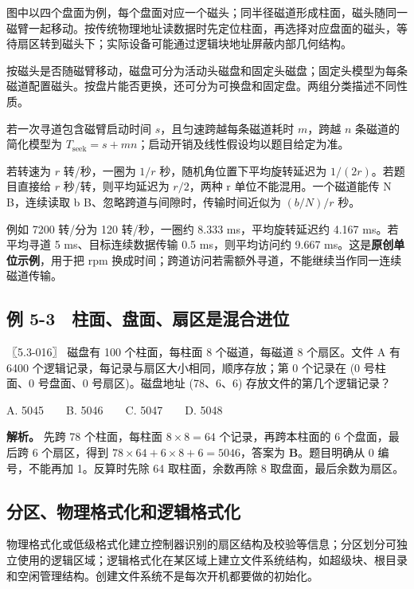 图中以四个盘面为例，每个盘面对应一个磁头；同半径磁道形成柱面，磁头随同一磁臂一起移动。按传统物理地址读数据时先定位柱面，再选择对应盘面的磁头，等待扇区转到磁头下；实际设备可能通过逻辑块地址屏蔽内部几何结构。

按磁头是否随磁臂移动，磁盘可分为活动头磁盘和固定头磁盘；固定头模型为每条磁道配置磁头。按盘片能否更换，还可分为可换盘和固定盘。两组分类描述不同性质。

若一次寻道包含磁臂启动时间 \(s\)，且匀速跨越每条磁道耗时 \(m\)，跨越 \(n\) 条磁道的简化模型为 \(T_{\mathrm{seek}}=s+mn\)；启动开销及线性假设均以题目给定为准。

若转速为 \(r\) 转/秒，一圈为 \(1/r\) 秒，随机角位置下平均旋转延迟为 \(1/(2r)\)。若题目直接给 \(r\) 秒/转，则平均延迟为 \(r/2\)，两种 r 单位不能混用。一个磁道能传 N B，连续读取 b B、忽略跨道与间隙时，传输时间近似为 \((b/N)/r\) 秒。

例如 7200 转/分为 120 转/秒，一圈约 8.333 ms，平均旋转延迟约 4.167 ms。若平均寻道 5 ms、目标连续数据传输 0.5 ms，则平均访问约 9.667 ms。这是\textbf{原创单位示例}，用于把 rpm 换成时间；跨道访问若需额外寻道，不能继续当作同一连续磁道传输。

\subsection{例 5-3　柱面、盘面、扇区是混合进位}\label{OS05-ex7-3}

\begin{example}[配套例题]

〖5.3-016〗 磁盘有 100 个柱面，每柱面 8 个磁道，每磁道 8 个扇区。文件 A 有 6400 个逻辑记录，每记录与扇区大小相同，顺序存放；第 0 个记录在 (0 号柱面、0 号盘面、0 号扇区)。磁盘地址 (78、6、6) 存放文件的第几个逻辑记录？

A. 5045　　B. 5046　　C. 5047　　D. 5048

\end{example}

\textbf{解析。} 先跨 78 个柱面，每柱面 \(8\times8=64\) 个记录，再跨本柱面的 6 个盘面，最后跨 6 个扇区，得到 \(78\times64+6\times8+6=5046\)，答案为 \textbf{B}。题目明确从 0 编号，不能再加 1。反算时先除 64 取柱面，余数再除 8 取盘面，最后余数为扇区。

\subsection{分区、物理格式化和逻辑格式化}\label{OS05-auto-2}

物理格式化或低级格式化建立控制器识别的扇区结构及校验等信息；分区划分可独立使用的逻辑区域；逻辑格式化在某区域上建立文件系统结构，如超级块、根目录和空闲管理结构。创建文件系统不是每次开机都要做的初始化。

